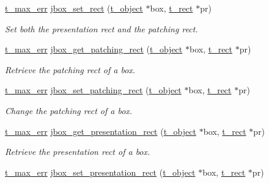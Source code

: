\begin{DoxyCompactItemize}
\hyperlink{group__datatypes_ga73edaae82b318855cc09fac994918165}{t\_\-max\_\-err} \hyperlink{group__jbox_gad342cd402e9dade9bb13b813a13f038c}{jbox\_\-set\_\-rect} (\hyperlink{structt__object}{t\_\-object} $\ast$box, \hyperlink{structt__rect}{t\_\-rect} $\ast$pr)
\begin{DoxyCompactList}\small\item\em Set both the presentation rect and the patching rect. \item\end{DoxyCompactList}\item 
\hyperlink{group__datatypes_ga73edaae82b318855cc09fac994918165}{t\_\-max\_\-err} \hyperlink{group__jbox_ga0e4d3502f3c114d2e9c71f309c9cade2}{jbox\_\-get\_\-patching\_\-rect} (\hyperlink{structt__object}{t\_\-object} $\ast$box, \hyperlink{structt__rect}{t\_\-rect} $\ast$pr)
\begin{DoxyCompactList}\small\item\em Retrieve the patching rect of a box. \item\end{DoxyCompactList}\item 
\hyperlink{group__datatypes_ga73edaae82b318855cc09fac994918165}{t\_\-max\_\-err} \hyperlink{group__jbox_gab9c38504ceb26b0674eba0ee31ff776b}{jbox\_\-set\_\-patching\_\-rect} (\hyperlink{structt__object}{t\_\-object} $\ast$box, \hyperlink{structt__rect}{t\_\-rect} $\ast$pr)
\begin{DoxyCompactList}\small\item\em Change the patching rect of a box. \item\end{DoxyCompactList}\item 
\hyperlink{group__datatypes_ga73edaae82b318855cc09fac994918165}{t\_\-max\_\-err} \hyperlink{group__jbox_ga987293837d1704cf7d461832e312c0b8}{jbox\_\-get\_\-presentation\_\-rect} (\hyperlink{structt__object}{t\_\-object} $\ast$box, \hyperlink{structt__rect}{t\_\-rect} $\ast$pr)
\begin{DoxyCompactList}\small\item\em Retrieve the presentation rect of a box. \item\end{DoxyCompactList}\item 
\hyperlink{group__datatypes_ga73edaae82b318855cc09fac994918165}{t\_\-max\_\-err} \hyperlink{group__jbox_gad7d842670d42f7959b9a388eaf716d46}{jbox\_\-set\_\-presentation\_\-rect} (\hyperlink{structt__object}{t\_\-object} $\ast$box, \hyperlink{structt__rect}{t\_\-rect} $\ast$pr)

\end{DoxyCompactItemize}
